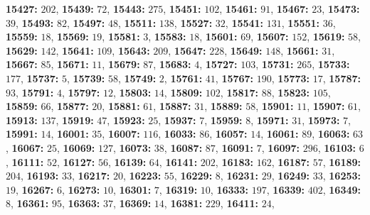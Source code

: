 \textsf{\bfseries 15427:} $202$, \textsf{\bfseries 15439:} $72$, \textsf{\bfseries 15443:} $275$, \textsf{\bfseries 15451:} $102$, \textsf{\bfseries 15461:} $91$, \textsf{\bfseries 15467:} $23$, \textsf{\bfseries 15473:} $39$, \textsf{\bfseries 15493:} $82$, \textsf{\bfseries 15497:} $48$, \textsf{\bfseries 15511:} $138$, \textsf{\bfseries 15527:} $32$, \textsf{\bfseries 15541:} $131$, \textsf{\bfseries 15551:} $36$, \textsf{\bfseries 15559:} $18$, \textsf{\bfseries 15569:} $19$, \textsf{\bfseries 15581:} $3$, \textsf{\bfseries 15583:} $18$, \textsf{\bfseries 15601:} $69$, \textsf{\bfseries 15607:} $152$, \textsf{\bfseries 15619:} $58$, \textsf{\bfseries 15629:} $142$, \textsf{\bfseries 15641:} $109$, \textsf{\bfseries 15643:} $209$, \textsf{\bfseries 15647:} $228$, \textsf{\bfseries 15649:} $148$, \textsf{\bfseries 15661:} $31$, \textsf{\bfseries 15667:} $85$, \textsf{\bfseries 15671:} $11$, \textsf{\bfseries 15679:} $87$, \textsf{\bfseries 15683:} $4$, \textsf{\bfseries 15727:} $103$, \textsf{\bfseries 15731:} $265$, \textsf{\bfseries 15733:} $177$, \textsf{\bfseries 15737:} $5$, \textsf{\bfseries 15739:} $58$, \textsf{\bfseries 15749:} $2$, \textsf{\bfseries 15761:} $41$, \textsf{\bfseries 15767:} $190$, \textsf{\bfseries 15773:} $17$, \textsf{\bfseries 15787:} $93$, \textsf{\bfseries 15791:} $4$, \textsf{\bfseries 15797:} $12$, \textsf{\bfseries 15803:} $14$, \textsf{\bfseries 15809:} $102$, \textsf{\bfseries 15817:} $88$, \textsf{\bfseries 15823:} $105$, \textsf{\bfseries 15859:} $66$, \textsf{\bfseries 15877:} $20$, \textsf{\bfseries 15881:} $61$, \textsf{\bfseries 15887:} $31$, \textsf{\bfseries 15889:} $58$, \textsf{\bfseries 15901:} $11$, \textsf{\bfseries 15907:} $61$, \textsf{\bfseries 15913:} $137$, \textsf{\bfseries 15919:} $47$, \textsf{\bfseries 15923:} $25$, \textsf{\bfseries 15937:} $7$, \textsf{\bfseries 15959:} $8$, \textsf{\bfseries 15971:} $31$, \textsf{\bfseries 15973:} $7$, \textsf{\bfseries 15991:} $14$, \textsf{\bfseries 16001:} $35$, \textsf{\bfseries 16007:} $116$, \textsf{\bfseries 16033:} $86$, \textsf{\bfseries 16057:} $14$, \textsf{\bfseries 16061:} $89$, \textsf{\bfseries 16063:} $63$, \textsf{\bfseries 16067:} $25$, \textsf{\bfseries 16069:} $127$, \textsf{\bfseries 16073:} $38$, \textsf{\bfseries 16087:} $87$, \textsf{\bfseries 16091:} $7$, \textsf{\bfseries 16097:} $296$, \textsf{\bfseries 16103:} $6$, \textsf{\bfseries 16111:} $52$, \textsf{\bfseries 16127:} $56$, \textsf{\bfseries 16139:} $64$, \textsf{\bfseries 16141:} $202$, \textsf{\bfseries 16183:} $162$, \textsf{\bfseries 16187:} $57$, \textsf{\bfseries 16189:} $204$, \textsf{\bfseries 16193:} $33$, \textsf{\bfseries 16217:} $20$, \textsf{\bfseries 16223:} $55$, \textsf{\bfseries 16229:} $8$, \textsf{\bfseries 16231:} $29$, \textsf{\bfseries 16249:} $33$, \textsf{\bfseries 16253:} $19$, \textsf{\bfseries 16267:} $6$, \textsf{\bfseries 16273:} $10$, \textsf{\bfseries 16301:} $7$, \textsf{\bfseries 16319:} $10$, \textsf{\bfseries 16333:} $197$, \textsf{\bfseries 16339:} $402$, \textsf{\bfseries 16349:} $8$, \textsf{\bfseries 16361:} $95$, \textsf{\bfseries 16363:} $37$, \textsf{\bfseries 16369:} $14$, \textsf{\bfseries 16381:} $229$, \textsf{\bfseries 16411:} $24$, 
